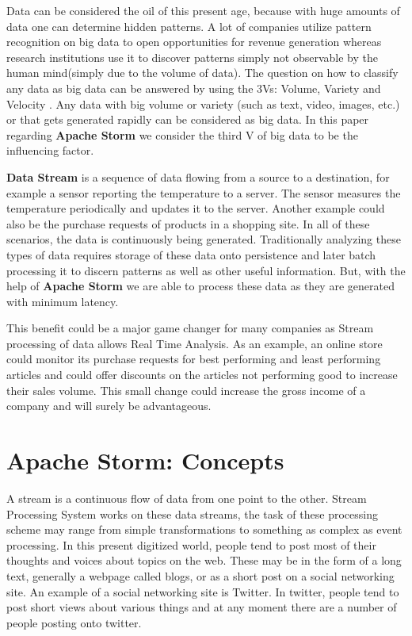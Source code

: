 \documentclass[runningheads,a4paper]{llncs}[2015/06/24]
\begin{document}
Data can be considered the oil of this present age, because with huge amounts of data one can determine hidden patterns. A lot of companies utilize pattern recognition on big data to open opportunities for revenue generation whereas research institutions use it to discover patterns simply not observable by the human mind(simply due to the volume of data). The question on how to classify any data as big data can be answered by using the 3Vs: Volume, Variety and Velocity \cite{usingapachestorm}. Any data with big volume or variety (such as text, video, images, etc.) or that gets generated rapidly can be considered as big data. In this paper regarding \textbf{Apache Storm} we consider the third V of big data to be the influencing factor.

\textbf{Data Stream} is a sequence of data flowing from a source to a destination, for example a sensor reporting the temperature to a server. The sensor measures the temperature periodically and updates it to the server. Another example could also be the purchase requests of products in a shopping site. In all of these scenarios, the data is continuously being generated. Traditionally analyzing these types of data requires storage of these data onto persistence and later batch processing it to discern patterns as well as other useful information. But, with the help of \textbf{Apache Storm} we are able to process these data as they are generated with minimum latency.

This benefit could be a major game changer for many companies as Stream processing of data allows Real Time Analysis. As an example, an online store could monitor its purchase requests for best performing and least performing articles and could offer discounts on the articles not performing good to increase their sales volume. This small change could increase the gross income of a company and will surely be advantageous.

\section{Apache Storm: Concepts}
\label{sec:concepts}
A stream is a continuous flow of data from one point to the other. Stream Processing System works on these data streams, the task of these processing scheme may range from simple transformations to something as complex as event processing. In this present digitized world, people tend to post most of their thoughts and voices about topics on the web. These may be in the form of a long text, generally a webpage called blogs, or as a short post on a social networking site. An example of a social networking site is Twitter. In twitter, people tend to post short views about various things and at any moment there are a number of people posting onto twitter.
\end{document}
